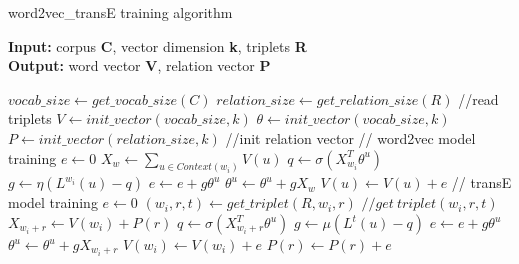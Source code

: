 \documentclass[10pt]{article}
\begin{document}
\begin{algorithm}
  \caption{ word2vec\_transE training algorithm}
  \textbf{Input:} corpus \textbf{C}, vector dimension \textbf{k}, triplets \textbf{R}\\
  \textbf{Output:} word vector \textbf{V}, relation vector \textbf{P}
  \begin{algorithmic}[1]
    \State $vocab\_size \leftarrow get\_vocab\_size(C)$
    \State $relation\_size \leftarrow get\_relation\_size(R)$  //read triplets
    \State $V \leftarrow init\_vector(vocab\_size,k)$
    \State $\theta \leftarrow init\_vector(vocab\_size,k)$
    \State $P \leftarrow init\_vector(relation\_size,k)$ //init relation vector
    		\State // word2vec model training
    		\State $e \leftarrow 0$
    		\State $X_w \leftarrow \sum_{u \in Context(w_i)} V(u)$
    			\State $q \leftarrow \sigma(X_{w_i}^T\theta^u)$
    			\State $g \leftarrow \eta(L^{w_i}(u)-q)$
    			\State $e \leftarrow e+g\theta^u $
    			\State $\theta^u \leftarrow \theta^u + gX_w$
    		\EndFor
			\State $V(u) \leftarrow V(u) + e$    		
    		\EndFor
    		\State // transE model training
    			\State $e \leftarrow 0$
    			\State $(w_i,r,t) \leftarrow get\_triplet(R,w_i,r)$ $//get\ triplet(w_i,r,t)$
    			\State $ X_{w_i+r} \leftarrow V(w_i)+ P(r)$
    			\State $q \leftarrow \sigma(X_{w_i+r}^T\theta^u)$
    			\State $g \leftarrow \mu (L^t(u)-q)$
    			\State $e \leftarrow e+g\theta^u $
    			\State $\theta^u \leftarrow \theta^u + gX_{w_i+r}$
    			\EndFor
    			\State $V(w_i) \leftarrow V(w_i) + e$
    			\State $P(r) \leftarrow P(r) + e$
    		\EndFor
    \EndFor
    \EndProcedure
  \end{algorithmic}
\end{algorithm}
\end{document}
